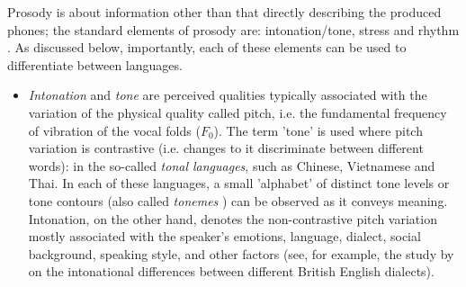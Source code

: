 \documentclass[bsc,frontabs,twoside,singlespacing,parskip,deptreport]{infthesis}
\begin{document}
{{{      %
      Prosody is about information other than that directly describing the produced phones; the standard elements of prosody are: intonation/tone, stress and rhythm \citep{Prieto_et_al_2018}. As discussed below, importantly, each of these elements can be used to differentiate between languages.
      \begin{itemize}
        \item {\textit{Intonation} and \textit{tone} are perceived qualities typically associated with the variation of the physical quality called pitch, i.e. the fundamental frequency of vibration of the vocal folds ($F_0$). The term 'tone' is used where pitch variation is contrastive (i.e. changes to it discriminate between different words): in the so-called \textit{tonal languages}, such as Chinese, Vietnamese and Thai. In each of these languages, a small 'alphabet' of distinct tone levels or tone contours (also called \textit{tonemes} \citep{Trask_2004}) can be observed as it conveys meaning. Intonation, on the other hand, denotes the non-contrastive pitch variation mostly associated with the speaker's emotions, language, dialect, social background, speaking style, and other factors (see, for example, the study by \citet{Grabe_2004} on the intonational differences between different British English dialects).}

\end{itemize}}}}
\end{document}
